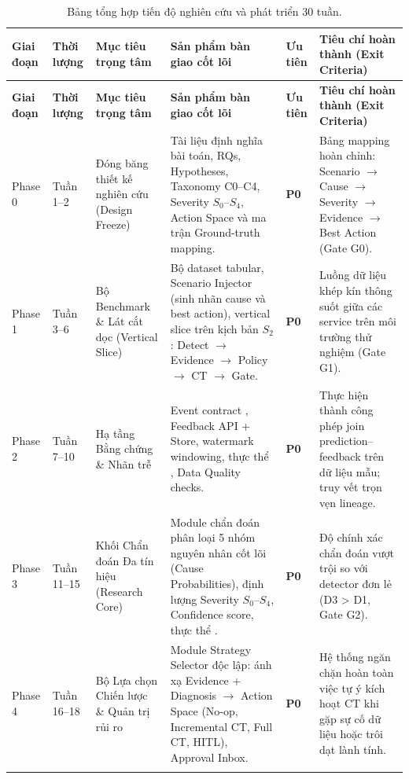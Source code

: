 \begin{xltabular}{\linewidth}{@{}L{1.6cm} L{1.8cm} L{3.6cm} L{4.4cm} C{1.4cm} Y@{}}
\caption{Bảng tổng hợp tiến độ nghiên cứu và phát triển 30 tuần.}\label{tab:roadmap}\\
\toprule
\textbf{Giai đoạn} & \textbf{Thời lượng} & \textbf{Mục tiêu trọng tâm} & \textbf{Sản phẩm bàn giao cốt lõi} & \textbf{Ưu tiên} & \textbf{Tiêu chí hoàn thành (Exit Criteria)} \\
\midrule
\endfirsthead
\toprule
\textbf{Giai đoạn} & \textbf{Thời lượng} & \textbf{Mục tiêu trọng tâm} & \textbf{Sản phẩm bàn giao cốt lõi} & \textbf{Ưu tiên} & \textbf{Tiêu chí hoàn thành (Exit Criteria)} \\
\midrule
\endhead

Phase 0 & Tuần 1--2 & Đóng băng thiết kế nghiên cứu (Design Freeze) & Tài liệu định nghĩa bài toán, RQs, Hypotheses, Taxonomy C0--C4, Severity $S_0$--$S_4$, Action Space và ma trận Ground-truth mapping. & \textbf{P0} & Bảng mapping hoàn chỉnh: Scenario $\rightarrow$ Cause $\rightarrow$ Severity $\rightarrow$ Evidence $\rightarrow$ Best Action (Gate G0). \\
\addlinespace

Phase 1 & Tuần 3--6 & Bộ Benchmark \& Lát cắt dọc (Vertical Slice) & Bộ dataset tabular, Scenario Injector (sinh nhãn cause và best action), vertical slice trên kịch bản $S_2$: Detect $\rightarrow$ Evidence $\rightarrow$ Policy $\rightarrow$ CT $\rightarrow$ Gate. & \textbf{P0} & Luồng dữ liệu khép kín thông suốt giữa các service trên môi trường thử nghiệm (Gate G1). \\
\addlinespace

Phase 2 & Tuần 7--10 & Hạ tầng Bằng chứng \& Nhãn trễ & Event contract , Feedback API + Store, watermark windowing, thực thể , Data Quality checks. & \textbf{P0} & Thực hiện thành công phép join prediction--feedback trên dữ liệu mẫu; truy vết trọn vẹn lineage. \\
\addlinespace

Phase 3 & Tuần 11--15 & Khối Chẩn đoán Đa tín hiệu (Research Core) & Module chẩn đoán phân loại 5 nhóm nguyên nhân cốt lõi (Cause Probabilities), định lượng Severity $S_0$--$S_4$, Confidence score, thực thể . & \textbf{P0} & Độ chính xác chẩn đoán vượt trội so với detector đơn lẻ (D3 > D1, Gate G2). \\
\addlinespace

Phase 4 & Tuần 16--18 & Bộ Lựa chọn Chiến lược \& Quản trị rủi ro & Module Strategy Selector độc lập: ánh xạ Evidence + Diagnosis $\rightarrow$ Action Space (No-op, Incremental CT, Full CT, HITL), Approval Inbox. & \textbf{P0} & Hệ thống ngăn chặn hoàn toàn việc tự ý kích hoạt CT khi gặp sự cố dữ liệu hoặc trôi dạt lành tính. \\
\addlinespace


\end{xltabular}

